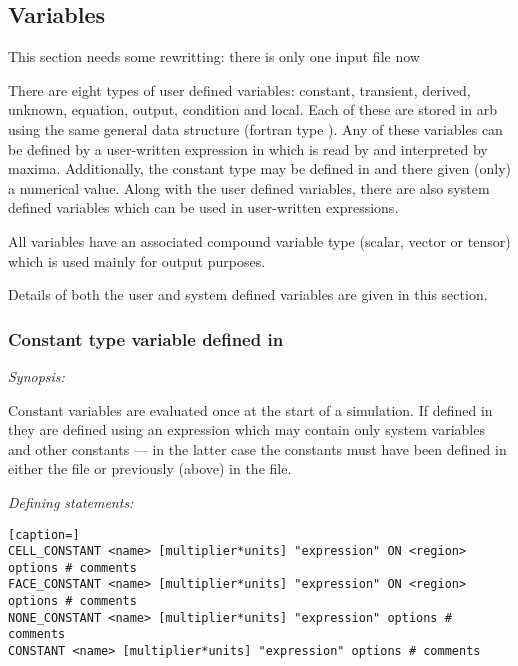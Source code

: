 \subsection{Variables}

{\color{red} This section needs some rewritting: there is only one input file now}

There are eight types of user defined variables:  constant, transient, derived, unknown, equation, output, condition and local.  Each of these are stored in arb using the same general data structure (fortran type ).  Any of these variables can be defined by a user-written expression in  which is read by  and interpreted by maxima.  Additionally, the constant type may be defined in  and there given (only) a numerical value.  Along with the user defined variables, there are also system defined variables which can be used in user-written expressions.

All variables have an associated compound variable type (scalar, vector or tensor) which is used mainly for output purposes.

Details of both the user and system defined variables are given in this section.

\subsubsection{Constant type variable defined in  \label{sec:equation_constants}}

\emph{Synopsis:}

Constant variables are evaluated once at the start of a simulation.  If defined in  they are defined using an expression which may contain only system variables and other constants --- in the latter case the constants must have been defined in either the  file or previously (above) in the  file.

\emph{Defining statements:}

\begin{lstlisting}[caption=]
CELL_CONSTANT <name> [multiplier*units] "expression" ON <region> options # comments
FACE_CONSTANT <name> [multiplier*units] "expression" ON <region> options # comments
NONE_CONSTANT <name> [multiplier*units] "expression" options # comments
CONSTANT <name> [multiplier*units] "expression" options # comments
\end{lstlisting}

